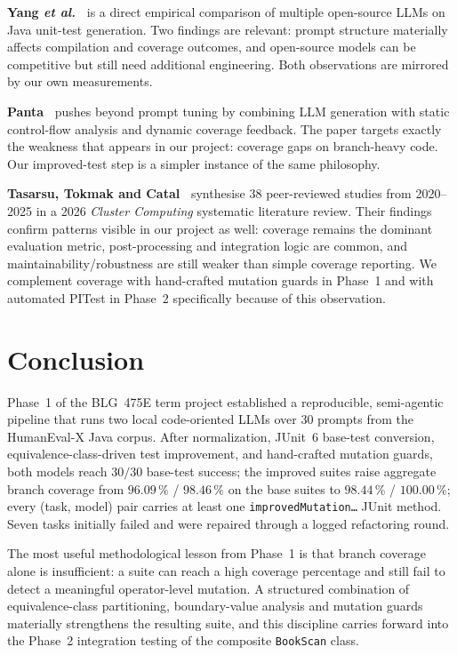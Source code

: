 \documentclass[journal]{IEEEtran}
\begin{document}
\textbf{Yang \emph{et al.}~\cite{yang2024}} is a direct empirical
comparison of multiple open-source LLMs on Java unit-test generation.
Two findings are relevant: prompt structure materially affects compilation
and coverage outcomes, and open-source models can be competitive but
still need additional engineering. Both observations are mirrored by our
own measurements.

\textbf{Panta~\cite{panta2024}} pushes beyond prompt tuning by combining
LLM generation with static control-flow analysis and dynamic coverage
feedback. The paper targets exactly the weakness that appears in our
project: coverage gaps on branch-heavy code. Our improved-test step is a
simpler instance of the same philosophy.

\textbf{Tasarsu, Tokmak and Catal~\cite{lit_review}} synthesise 38
peer-reviewed studies from 2020--2025 in a 2026 \emph{Cluster Computing}
systematic literature review. Their findings confirm patterns visible in
our project as well: coverage remains the dominant evaluation metric,
post-processing and integration logic are common, and
maintainability/robustness are still weaker than simple coverage
reporting. We complement coverage with hand-crafted mutation guards in
Phase~1 and with automated PITest in Phase~2 specifically because of this
observation.

\section{Conclusion}\label{sec:conclusion}

Phase~1 of the BLG~475E term project established a reproducible,
semi-agentic pipeline that runs two local code-oriented LLMs over 30
prompts from the HumanEval-X Java corpus. After normalization, JUnit~6
base-test conversion, equivalence-class-driven test improvement, and
hand-crafted mutation guards, both models reach $30/30$ base-test
success; the improved suites raise aggregate branch coverage from
$96.09\,\%$ / $98.46\,\%$ on the base suites to $98.44\,\%$ / $100.00\,\%$;
every (task, model) pair carries at least one \texttt{improvedMutation\ldots}
JUnit method. Seven tasks initially failed and were repaired through a
logged refactoring round.

The most useful methodological lesson from Phase~1 is that branch coverage
alone is insufficient: a suite can reach a high coverage percentage and
still fail to detect a meaningful operator-level mutation. A structured
combination of equivalence-class partitioning, boundary-value analysis and
mutation guards materially strengthens the resulting suite, and this
discipline carries forward into the Phase~2 integration testing of the
composite \texttt{BookScan} class.
\end{document}
